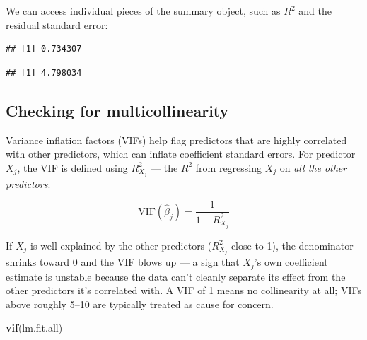 \documentclass[
  11pt,
]{article}
\newenvironment{Shaded}{\begin{snugshade}}{\end{snugshade}}
\newcommand{\FunctionTok}[1]{\textcolor[rgb]{0.13,0.29,0.53}{\textbf{#1}}}
\newcommand{\NormalTok}[1]{#1}
\newcommand{\SpecialCharTok}[1]{\textcolor[rgb]{0.81,0.36,0.00}{\textbf{#1}}}
\begin{document}
We can access individual pieces of the summary object, such as \(R^2\)
and the residual standard error:

\begin{Shaded}
\end{Shaded}

\begin{verbatim}
## [1] 0.734307
\end{verbatim}

\begin{Shaded}
\end{Shaded}

\begin{verbatim}
## [1] 4.798034
\end{verbatim}

\subsection{Checking for
multicollinearity}\label{checking-for-multicollinearity}

Variance inflation factors (VIFs) help flag predictors that are highly
correlated with other predictors, which can inflate coefficient standard
errors. For predictor \(X_j\), the VIF is defined using \(R^2_{X_j}\)
--- the \(R^2\) from regressing \(X_j\) on \emph{all the other
predictors}:

\[
\text{VIF}(\hat\beta_j) = \frac{1}{1 - R^2_{X_j}}
\]

If \(X_j\) is well explained by the other predictors (\(R^2_{X_j}\)
close to 1), the denominator shrinks toward 0 and the VIF blows up --- a
sign that \(X_j\)'s own coefficient estimate is unstable because the
data can't cleanly separate its effect from the other predictors it's
correlated with. A VIF of 1 means no collinearity at all; VIFs above
roughly 5--10 are typically treated as cause for concern.

\begin{Shaded}
\begin{Highlighting}[]
\FunctionTok{vif}\NormalTok{(lm.fit.all)}
\end{Highlighting}
\end{Shaded}
\end{document}
